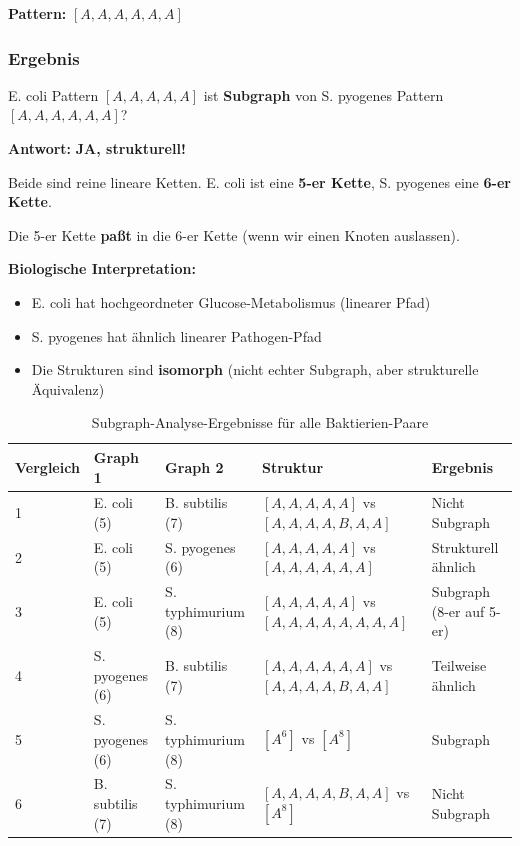 \documentclass[a4paper,12pt]{article}
\theoremstyle{definition}
\begin{document}
\textbf{Pattern:} $[A, A, A, A, A, A]$

\subsubsection{Ergebnis}

E. coli Pattern $[A, A, A, A, A]$ ist \textbf{Subgraph} von S. pyogenes Pattern $[A, A, A, A, A, A]$?

\textbf{Antwort:} \textbf{JA, strukturell!}

Beide sind reine lineare Ketten. E. coli ist eine \textbf{5-er Kette}, S. pyogenes eine \textbf{6-er Kette}.

Die 5-er Kette \textbf{paßt} in die 6-er Kette (wenn wir einen Knoten auslassen).

\textbf{Biologische Interpretation:}
\begin{itemize}
    \item E. coli hat hochgeordneter Glucose-Metabolismus (linearer Pfad)
    \item S. pyogenes hat ähnlich linearer Pathogen-Pfad
    \item Die Strukturen sind \textbf{isomorph} (nicht echter Subgraph, aber strukturelle Äquivalenz)
\end{itemize}

\begin{table}
\centering
\begin{tabular}{|l|l|l|l|l|}
\hline
\textbf{Vergleich} & \textbf{Graph 1} & \textbf{Graph 2} & \textbf{Struktur} & \textbf{Ergebnis} \\
\hline
1 & E. coli (5) & B. subtilis (7) & $[A,A,A,A,A]$ vs $[A,A,A,A,B,A,A]$ & Nicht Subgraph \\
\hline
2 & E. coli (5) & S. pyogenes (6) & $[A,A,A,A,A]$ vs $[A,A,A,A,A,A]$ & Strukturell ähnlich \\
\hline
3 & E. coli (5) & S. typhimurium (8) & $[A,A,A,A,A]$ vs $[A,A,A,A,A,A,A,A]$ & Subgraph (8-er auf 5-er) \\
\hline
4 & S. pyogenes (6) & B. subtilis (7) & $[A,A,A,A,A,A]$ vs $[A,A,A,A,B,A,A]$ & Teilweise ähnlich \\
\hline
5 & S. pyogenes (6) & S. typhimurium (8) & $[A^6]$ vs $[A^8]$ & Subgraph \\
\hline
6 & B. subtilis (7) & S. typhimurium (8) & $[A,A,A,A,B,A,A]$ vs $[A^8]$ & Nicht Subgraph \\
\hline
\end{tabular}
\caption{Subgraph-Analyse-Ergebnisse für alle Baktierien-Paare}
\end{table}
\end{document}

